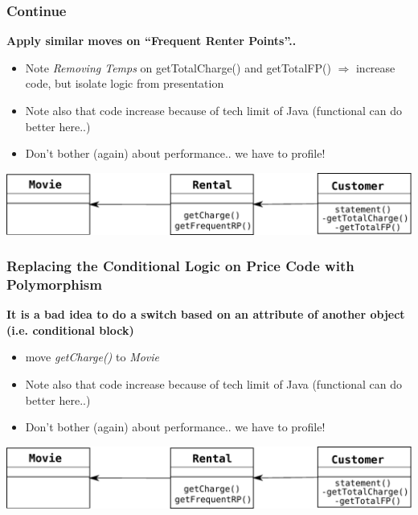 \documentclass{beamer}
\begin{document}
\begin{frame}
  \frametitle{Continue}
  \textbf{Apply similar moves on ``Frequent Renter Points''.. }
     \begin{itemize}
  		\item Note \textit{Removing Temps} on getTotalCharge() and getTotalFP() $\Rightarrow$ increase code, but isolate logic from presentation
  		\item Note also that code increase because of tech limit of Java (functional can do better here..)
  		\item Don't bother (again) about performance.. we have to profile!
  	\end{itemize}
  	\begin{center}
		\includegraphics[scale=0.5]{refactorApply}
	\end{center}
\end{frame}

\begin{frame}
  \frametitle{Replacing the Conditional Logic on Price Code with Polymorphism}
  \textbf{It is a bad idea to do a switch based on an attribute of another object (i.e. conditional block)}
     \begin{itemize}
  		\item move \textit{getCharge()} to \textit{Movie}
  		\item Note also that code increase because of tech limit of Java (functional can do better here..)
  		\item Don't bother (again) about performance.. we have to profile!
  	\end{itemize}
  	\begin{center}
		\includegraphics[scale=0.5]{refactorApply}
	\end{center}
\end{frame}
\end{document}
